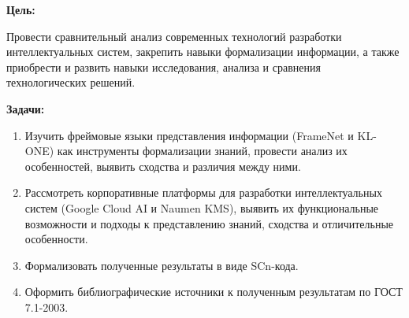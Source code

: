 
\textbf{Цель:}

Провести сравнительный анализ современных технологий разработки
интеллектуальных систем, закрепить навыки формализации информации,
а также приобрести и развить навыки исследования, анализа и сравнения
технологических решений.
\bigskip

\textbf{Задачи:}

\begin{enumerate}
    \item Изучить фреймовые языки представления информации (FrameNet и KL-ONE) как инструменты формализации знаний, провести анализ их особенностей, выявить сходства и различия между ними.
    \item Рассмотреть корпоративные платформы для разработки интеллектуальных систем (Google Cloud AI и Naumen KMS), выявить их функциональные возможности и подходы к представлению знаний, сходства и отличительные особенности.
    \item Формализовать полученные результаты в виде SCn-кода.
    \item Оформить библиографические источники к полученным результатам по ГОСТ 7.1-2003.
\end{enumerate}